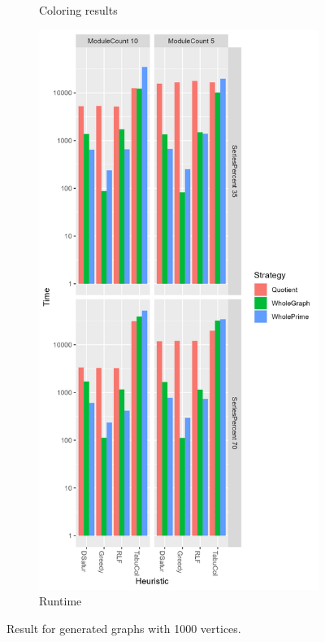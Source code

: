 \documentclass[a4paper]{article}
\begin{document}
\begin{figure}[p]
\begin{subfigure}{.4\paperwidth}
      \caption{Coloring results}
      \label{fig:1000c}
    \end{subfigure}%
    \begin{subfigure}{.4\paperwidth}
        \includegraphics[width=\columnwidth]{Tables/1000Time.png}
      \caption{Runtime}
      \label{fig:1000t}
    \end{subfigure}
\caption{Result for generated graphs with 1000 vertices. \facfigdesc }
\label{fig:1000}
\end{figure}
\end{document}
